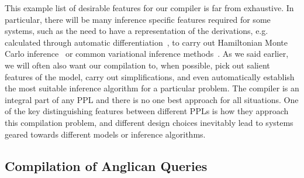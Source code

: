 This example list of desirable features for our compiler is far from exhaustive.
In particular, there will be many inference specific features required for some
systems, such as the need to have a representation of the derivations, e.g. calculated
through automatic differentiation~\cite{baydin2015automatic}, to carry out 
Hamiltonian Monte Carlo inference~\cite{carpenter2015stan}
or common variational inference methods~\citep{kucukelbir2015automatic}.  As we
said earlier, we will often also want our compilation to, when possible,
pick out salient features of the model, carry out simplifications, and even automatically 
establish the most suitable inference algorithm for a particular problem.  The compiler
is an integral part of any PPL and there is no one best approach for all situations. 
One of the key distinguishing features between different PPLs is how they approach
this compilation problem, and different design choices inevitably lead to systems
geared towards different models or inference algorithms. 

\subsection{Compilation of Anglican Queries}
\label{sec:proginf:comp:ang}

